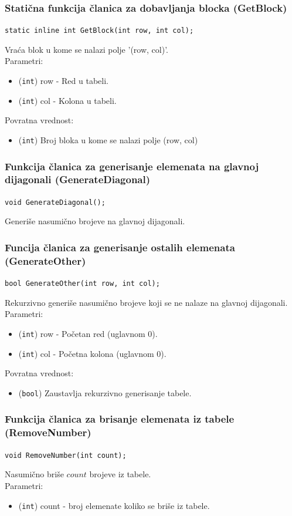 \documentclass[a4paper]{article}
\begin{document}
    \subsubsection{Statična funkcija članica za dobavljanja blocka (GetBlock)}
    \texttt{static inline int GetBlock(int row, int col);}
    \par Vraća blok u kome se nalazi polje '(row, col)'.\\
    Parametri:
    \begin{itemize}
        \item (\texttt{int}) row - Red u tabeli.
        \item (\texttt{int}) col - Kolona u tabeli.
    \end{itemize}
    Povratna vrednost:
    \begin{itemize}
        \item (\texttt{int}) Broj bloka u kome se nalazi polje (row, col)
    \end{itemize}

    \subsubsection{Funkcija članica za generisanje elemenata na glavnoj dijagonali (GenerateDiagonal)}
	\texttt{void GenerateDiagonal();}
	\par Generiše nasumično brojeve na glavnoj dijagonali.

    \subsubsection{Funcija članica za generisanje ostalih elemenata (GenerateOther)}
    \texttt{bool GenerateOther(int row, int col);}
    \par Rekurzivno generiše nasumično brojeve koji se ne nalaze na glavnoj dijagonali.\\
	Parametri:
    \begin{itemize}
        \item (\texttt{int}) row - Početan red (uglavnom 0).
        \item (\texttt{int}) col - Početna kolona (uglavnom 0).
    \end{itemize}
    Povratna vrednost:
    \begin{itemize}
        \item (\texttt{bool}) Zaustavlja rekurzivno generisanje tabele.
    \end{itemize}

    \subsubsection{Funkcija članica za brisanje elemenata iz tabele (RemoveNumber)}
	\texttt{void RemoveNumber(int count);}
    \par Nasumično briše $count$ brojeve iz tabele.\\
    Parametri:
    \begin{itemize}
        \item (\texttt{int}) count - broj elemenate koliko se briše iz tabele.
    \end{itemize}
\end{document}
